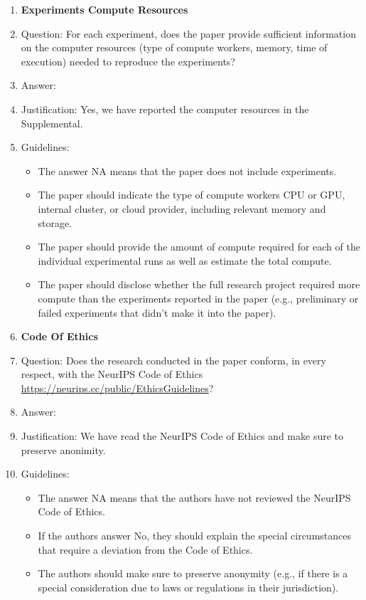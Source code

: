 \documentclass{article} %
\newcounter{ct}
\theoremstyle{definition}
\theoremstyle{remark}
\begin{document}
\begin{enumerate}
\item {\bf Experiments Compute Resources}
    \item[] Question: For each experiment, does the paper provide sufficient information on the computer resources (type of compute workers, memory, time of execution) needed to reproduce the experiments?
    \item[] Answer: \answerYes{} %
    \item[] Justification: Yes, we have reported the computer resources in the Supplemental.
    \item[] Guidelines:
    \begin{itemize}
        \item The answer NA means that the paper does not include experiments.
        \item The paper should indicate the type of compute workers CPU or GPU, internal cluster, or cloud provider, including relevant memory and storage.
        \item The paper should provide the amount of compute required for each of the individual experimental runs as well as estimate the total compute. 
        \item The paper should disclose whether the full research project required more compute than the experiments reported in the paper (e.g., preliminary or failed experiments that didn't make it into the paper). 
    \end{itemize}
    
\item {\bf Code Of Ethics}
    \item[] Question: Does the research conducted in the paper conform, in every respect, with the NeurIPS Code of Ethics \url{https://neurips.cc/public/EthicsGuidelines}?
    \item[] Answer: \answerYes{} %
    \item[] Justification: We have read the NeurIPS Code of Ethics and make sure to preserve anonimity.
    \item[] Guidelines:
    \begin{itemize}
        \item The answer NA means that the authors have not reviewed the NeurIPS Code of Ethics.
        \item If the authors answer No, they should explain the special circumstances that require a deviation from the Code of Ethics.
        \item The authors should make sure to preserve anonymity (e.g., if there is a special consideration due to laws or regulations in their jurisdiction).
    \end{itemize}



\end{enumerate}
\end{document}
